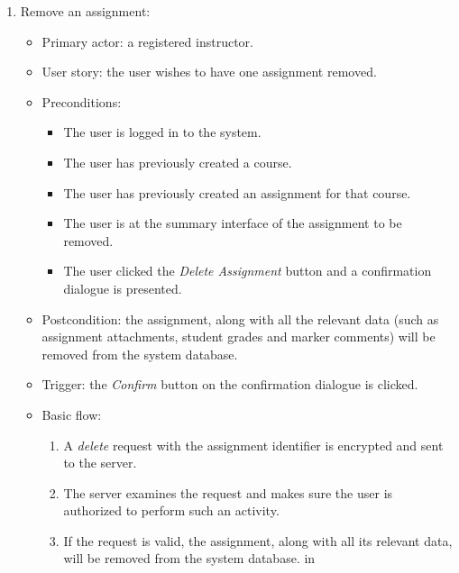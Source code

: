 \begin{enumerate}
\item Remove an assignment:
\begin{itemize}
    \item Primary actor: a registered instructor.
    \item User story: the user wishes to have one assignment removed.
    \item Preconditions:
        \begin{itemize}
            \item The user is logged in to the system.
            \item The user has previously created a course.
            \item The user has previously created an assignment for that course.
            \item The user is at the summary interface of the assignment to be
                removed.
            \item The user clicked the \emph{Delete Assignment} button and a
                confirmation dialogue is presented.
        \end{itemize}
    \item Postcondition:
        the assignment, along with all the relevant data (such as assignment
        attachments, student grades and marker comments) will be removed from
        the system database.
    \item Trigger: the \emph{Confirm} button on the confirmation dialogue is
        clicked.
    \item Basic flow:
        \begin{enumerate}
            \item A \emph{delete} request with the assignment identifier is encrypted
                and sent to the server.
            \item The server examines the request and makes sure the user is
                authorized to perform such an activity.
            \item If the request is valid, the assignment, along with all its
                relevant data, will be removed from the system database.
                 in
        \end{enumerate}
\end{itemize}


\end{enumerate}
